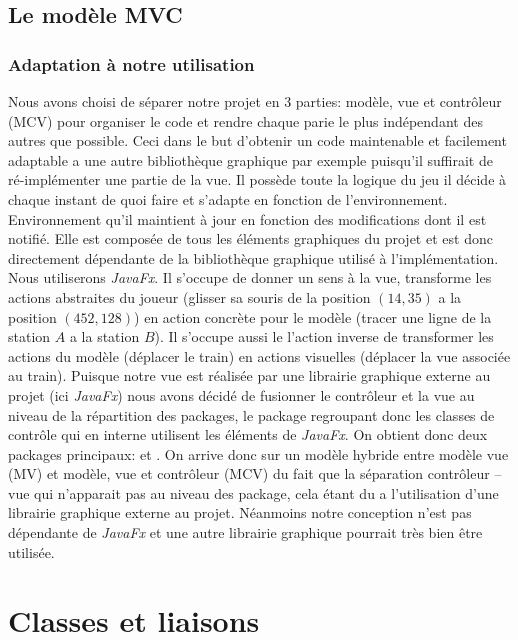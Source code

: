 \documentclass[report, backcover, french, nodocumentinfo]{upmethodology-document}
\begin{document}
		\section{Le modèle MVC}
			\subsection{Adaptation à notre utilisation}
					Nous avons choisi de séparer notre projet en 3 parties: modèle, vue et contrôleur (MCV) pour organiser le code et rendre chaque parie le plus indépendant des autres que possible. Ceci dans le but d'obtenir un code maintenable et facilement adaptable a une autre bibliothèque graphique par exemple puisqu'il suffirait de ré-implémenter une partie de la vue.
					Il possède toute la logique du jeu il décide à chaque instant de quoi faire et s'adapte en fonction de l’environnement. Environnement qu'il maintient à jour en fonction des modifications dont il est notifié.
					Elle est composée de tous les éléments graphiques du projet et est donc directement dépendante de la bibliothèque graphique utilisé à l'implémentation. Nous utiliserons \textit{JavaFx}.
					Il s'occupe de donner un sens à la vue, transforme les actions abstraites du joueur (glisser sa souris de la position $(14,35)$ a la position $(452,128)$) en action concrète pour le modèle (tracer une ligne de la station $A$ a la station $B$). Il s’occupe aussi le l'action inverse de transformer les actions du modèle (déplacer le train) en actions visuelles (déplacer la vue associée au train).
					Puisque notre vue est réalisée par une librairie graphique externe au projet (ici \textit{JavaFx}) nous avons décidé de fusionner le contrôleur et la vue au niveau de la répartition des packages, le package  regroupant donc les classes de contrôle qui en interne utilisent les éléments de \textit{JavaFx}. On obtient donc deux packages principaux:  et .
				\p{}
					On arrive donc sur un modèle hybride entre modèle vue (MV) et modèle, vue et contrôleur (MCV) du fait que la séparation contrôleur -- vue qui n'apparait pas au niveau des package, cela étant du a l'utilisation d'une librairie graphique externe au projet. Néanmoins notre conception n'est pas dépendante de \textit{JavaFx} et une autre librairie graphique pourrait très bien être utilisée.

	\chapter{Classes et liaisons}
\end{document}
